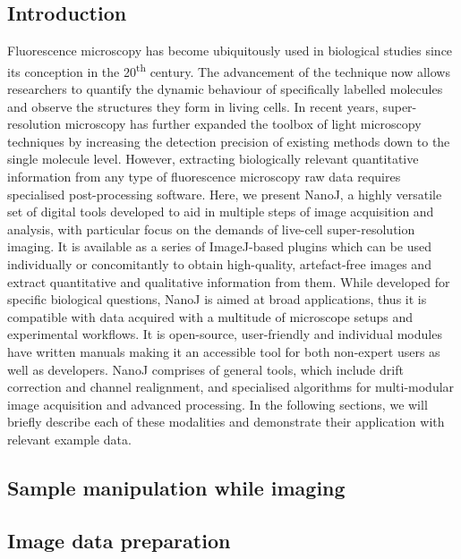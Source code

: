 \subsection*{Introduction}
  Fluorescence microscopy has become ubiquitously used in biological studies since its conception in the 20\textsuperscript{th} century. The advancement of the technique now allows researchers to quantify the dynamic behaviour of specifically labelled molecules and observe the structures they form in living cells. In recent years, super-resolution microscopy has further expanded the toolbox of light microscopy techniques by increasing the detection precision of existing methods down to the single molecule level. However, extracting biologically relevant quantitative information from any type of fluorescence microscopy raw data requires specialised post-processing software.
  \newline
  Here, we present NanoJ, a highly versatile set of digital tools developed to aid in multiple steps of image acquisition and analysis, with particular focus on the demands of live-cell super-resolution imaging. It is available as a series of ImageJ-based plugins which can be used individually or concomitantly to obtain high-quality, artefact-free images and extract quantitative and qualitative information from them. While developed for specific biological questions, NanoJ is aimed at broad applications, thus it is compatible with data acquired with a multitude of microscope setups and experimental workflows. It is open-source, user-friendly and individual modules have written manuals making it an accessible tool for both non-expert users as well as developers.
  NanoJ comprises of general tools, which include drift correction and channel realignment, and specialised algorithms for multi-modular image acquisition and advanced processing. In the following sections, we will briefly describe each of these modalities and demonstrate their application with relevant example data.
  
\subsection*{Sample manipulation while imaging}
\Blindtext

\subsection*{Image data preparation}
\Blindtext

